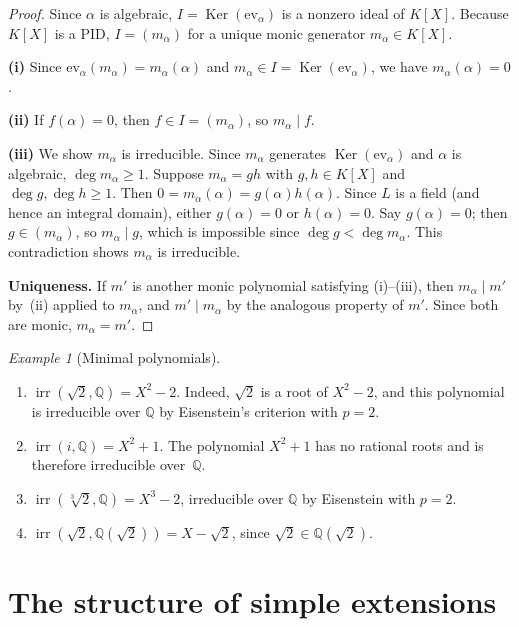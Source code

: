 \documentclass[12pt,a4paper,openany]{book}
\theoremstyle{definition}
\theoremstyle{remark}
\newtheorem{example}{Example}[chapter]
\newcommand{\Q}{\mathbb{Q}}
\DeclareMathOperator{\Ker}{Ker}
\renewcommand{\deg}{\operatorname{deg}}
\DeclareMathOperator{\irr}{irr}
\begin{document}
\begin{proof}
Since $\alpha$ is algebraic, $I = \Ker(\mathrm{ev}_\alpha)$ is a
nonzero ideal of $K[X]$. Because $K[X]$ is a PID, $I = (m_\alpha)$
for a unique monic generator $m_\alpha \in K[X]$.

\textbf{(i)} Since $\mathrm{ev}_\alpha(m_\alpha) = m_\alpha(\alpha)$
and $m_\alpha \in I = \Ker(\mathrm{ev}_\alpha)$, we have
$m_\alpha(\alpha) = 0$.

\textbf{(ii)} If $f(\alpha) = 0$, then $f \in I = (m_\alpha)$, so
$m_\alpha \mid f$.

\textbf{(iii)} We show $m_\alpha$ is irreducible. Since $m_\alpha$
generates $\Ker(\mathrm{ev}_\alpha)$ and $\alpha$ is algebraic,
$\deg m_\alpha \ge 1$. Suppose $m_\alpha = gh$ with
$g, h \in K[X]$ and $\deg g, \deg h \ge 1$. Then
$0 = m_\alpha(\alpha) = g(\alpha) h(\alpha)$. Since $L$ is a field
(and hence an integral domain), either $g(\alpha) = 0$ or
$h(\alpha) = 0$. Say $g(\alpha) = 0$; then $g \in (m_\alpha)$,
so $m_\alpha \mid g$, which is impossible since
$\deg g < \deg m_\alpha$. This contradiction shows $m_\alpha$ is
irreducible.

\textbf{Uniqueness.} If $m'$ is another monic polynomial satisfying
(i)--(iii), then $m_\alpha \mid m'$ by~(ii) applied to $m_\alpha$,
and $m' \mid m_\alpha$ by the analogous property of $m'$. Since both
are monic, $m_\alpha = m'$.
\end{proof}

\begin{example}[Minimal polynomials]
\label{ex:minimal-polys}
\begin{enumerate}[label=(\roman*)]
  \item $\irr(\sqrt{2}, \Q) = X^2 - 2$. Indeed, $\sqrt{2}$ is a root
    of $X^2 - 2$, and this polynomial is irreducible over $\Q$ by
    Eisenstein's criterion with $p = 2$.
  \item $\irr(i, \Q) = X^2 + 1$. The polynomial $X^2+1$ has no
    rational roots and is therefore irreducible over~$\Q$.
  \item $\irr(\sqrt[3]{2}, \Q) = X^3 - 2$, irreducible over $\Q$ by
    Eisenstein with $p = 2$.
  \item $\irr(\sqrt{2}, \Q(\sqrt{2})) = X - \sqrt{2}$, since
    $\sqrt{2} \in \Q(\sqrt{2})$.
\end{enumerate}
\end{example}

\section{The structure of simple extensions}
\label{sec:simple-extensions}
\end{document}
